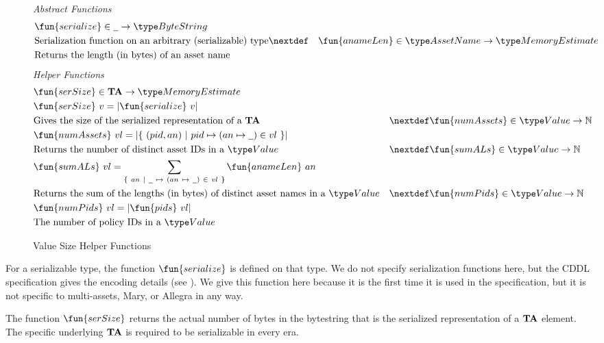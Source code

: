 \begin{figure*}[h]
  \emph{Abstract Functions}
  \begin{align*}
    & \fun{serialize} \in \wcard \to \ByteString \\
    & \text{Serialization function on an arbitrary (serializable) type}
    \nextdef
    & \fun{anameLen} \in \AssetName \to \MemoryEstimate \\
    & \text{Returns the length (in bytes) of an asset name}
  \end{align*}
  \emph{Helper Functions}
  \begin{align*}
    & \fun{serSize} \in \ValMonoid \to \MemoryEstimate \\
    & \fun{serSize}~v=\lvert \fun{serialize}~{v} \rvert \\
    & \text{Gives the size of the serialized representation of a $\ValMonoid$}
    & \nextdef
    & \fun{numAssets} \in \Value \to \N \\
    & \fun{numAssets}~{vl}=\lvert \{~(pid, an)~\vert~ pid \mapsto (an \mapsto \wcard) \in vl~\} \rvert \\
    & \text{Returns the number of distinct asset IDs in a $\Value$}
    & \nextdef
    & \fun{sumALs} \in \Value \to \N \\
    & \fun{sumALs}~{vl}= \sum_{\{~an~\vert~\wcard~\mapsto~(an~\mapsto~\wcard)~\in~vl~\}} \fun{anameLen}~an \\
    & \text{Returns the sum of the lengths (in bytes) of distinct asset names in a $\Value$}
    & \nextdef
    & \fun{numPids} \in \Value \to \N \\
    & \fun{numPids}~{vl} = \lvert \fun{pids}~{vl} \rvert \\
    & \text{The number of policy IDs in a $\Value$}
  \end{align*}
  \caption{Value Size Helper Functions}
  \label{fig:size-helper}
\end{figure*}

For a serializable type, the function $\fun{serialize}$ is defined on that type. We do not
specify serialization functions here, but the CDDL specification gives the encoding
details (see \cite{alonzoCDDL}). We give this function here because it is the
first time it is used in the specification, but it is not specific to
multi-assets, Mary, or Allegra in any way.

The function $\fun{serSize}$ returns the actual number of bytes in the bytestring that is the
    serialized representation of a $\mathbf{TA}$ element. The specific underlying $\mathbf{TA}$
    is required to be serializable in every era.

